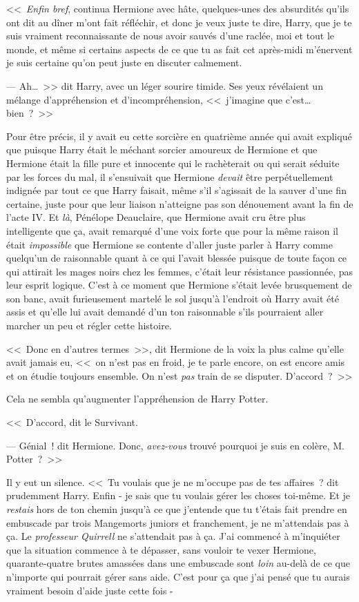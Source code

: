 <<~\emph{Enfin bref}, continua Hermione avec hâte, quelques-unes des absurdités qu'ils ont dit au dîner m'ont fait réfléchir, et donc je veux juste te dire, Harry, que je te suis vraiment reconnaissante de nous avoir sauvés d'une raclée, moi et tout le monde, et même si certains aspects de ce que tu as fait cet après-midi m'énervent je suis certaine qu'on peut juste en discuter calmement.

--- Ah…~>> dit Harry, avec un léger sourire timide. Ses yeux révélaient un mélange d'appréhension et d'incompréhension, <<~j'imagine que c'est… bien~?~>>

Pour être précis, il y avait eu cette sorcière en quatrième année qui avait expliqué que puisque Harry était le méchant sorcier amoureux de Hermione et que Hermione était la fille pure et innocente qui le rachèterait ou qui serait séduite par les forces du mal, il s'ensuivait que Hermione \emph{devait} être perpétuellement indignée par tout ce que Harry faisait, même s'il s'agissait de la sauver d'une fin certaine, juste pour que leur liaison n'atteigne pas son dénouement avant la fin de l'acte IV. Et \emph{là}, Pénélope Deauclaire, que Hermione avait cru être plus intelligente que ça, avait remarqué d'une voix forte que pour la même raison il était \emph{impossible} que Hermione se contente d'aller juste parler à Harry comme quelqu'un de raisonnable quant à ce qui l'avait blessée puisque de toute façon ce qui attirait les mages noirs chez les femmes, c'était leur résistance passionnée, pas leur esprit logique. C'est à ce moment que Hermione s'était levée brusquement de son banc, avait furieusement martelé le sol jusqu'à l'endroit où Harry avait été assis et qu'elle lui avait demandé d'un ton raisonnable s'ils pourraient aller marcher un peu et régler cette histoire.

<<~Donc en d'autres termes~>>, dit Hermione de la voix la plus calme qu'elle avait jamais eu, <<~on n'est pas en froid, je te parle encore, on est encore amis et on étudie toujours ensemble. On n'est \emph{pas} train de se disputer. D'accord~?~>>

Cela ne sembla qu'augmenter l'appréhension de Harry Potter.

<<~D'accord, dit le Survivant.

--- Génial~! dit Hermione. Donc, \emph{avez-vous} trouvé pourquoi je suis en colère, M. Potter~?~>>

Il y eut un silence. <<~Tu voulais que je ne m'occupe pas de tes affaires~? dit prudemment Harry. Enfin - je sais que tu voulais gérer les choses toi-même. Et je \emph{restais} hors de ton chemin jusqu'à ce que j'entende que tu t'étais fait prendre en embuscade par trois Mangemorts juniors et franchement, je ne m'attendais pas à ça. Le \emph{professeur Quirrell} ne s'attendait pas à ça. J'ai commencé à m'inquiéter que la situation commence à te dépasser, sans vouloir te vexer Hermione, quarante-quatre brutes amassées dans une embuscade sont \emph{loin} au-delà de ce que n'importe qui pourrait gérer sans aide. C'est pour ça que j'ai pensé que tu aurais vraiment besoin d'aide juste cette fois -

